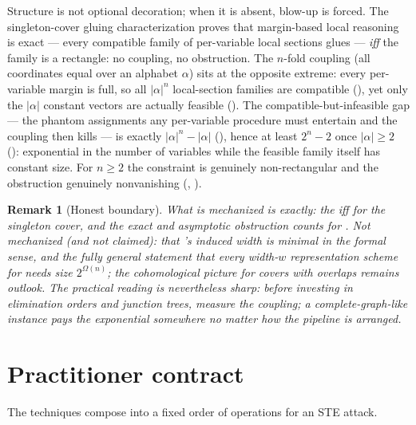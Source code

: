 \documentclass[11pt]{article}
\newtheorem{remark}{Remark}
\begin{document}
Structure is not optional decoration; when it is absent, blow-up is
forced.  The singleton-cover gluing characterization
 proves that margin-based local
reasoning is exact --- every compatible family of per-variable local
sections glues --- \emph{iff} the family is a rectangle: no coupling, no
obstruction.  The $n$-fold coupling  (all coordinates
equal over an alphabet $\alpha$) sits at the opposite extreme: every
per-variable margin is full, so all $|\alpha|^n$ local-section families
are compatible (), yet only the
$|\alpha|$ constant vectors are actually feasible
().  The compatible-but-infeasible gap --- the
phantom assignments any per-variable procedure must entertain and the
coupling then kills --- is exactly $|\alpha|^n-|\alpha|$
(), hence at least $2^n-2$ once
$|\alpha|\ge 2$ (): exponential in the
number of variables while the feasible family itself has constant size.
For $n\ge 2$ the constraint is genuinely non-rectangular and the
obstruction genuinely nonvanishing (,
).

\begin{remark}[Honest boundary]
What is mechanized is exactly: the iff for the singleton cover, and the
exact and asymptotic obstruction counts for .  Not
mechanized (and not claimed): that 's induced width is
minimal in the formal  sense, and the fully general
statement that \emph{every} width-$w$ representation scheme for
 needs size $2^{\Omega(n)}$; the cohomological picture
for covers with overlaps \citep{abramsky2011sheaf} remains outlook.
The practical reading is nevertheless sharp: before investing in
elimination orders and junction trees, measure the coupling; a
complete-graph-like instance pays the exponential somewhere no matter
how the pipeline is arranged.
\end{remark}

\section{Practitioner contract}
\label{sec:contract}

The techniques compose into a fixed order of operations for an STE
attack.
\end{document}
